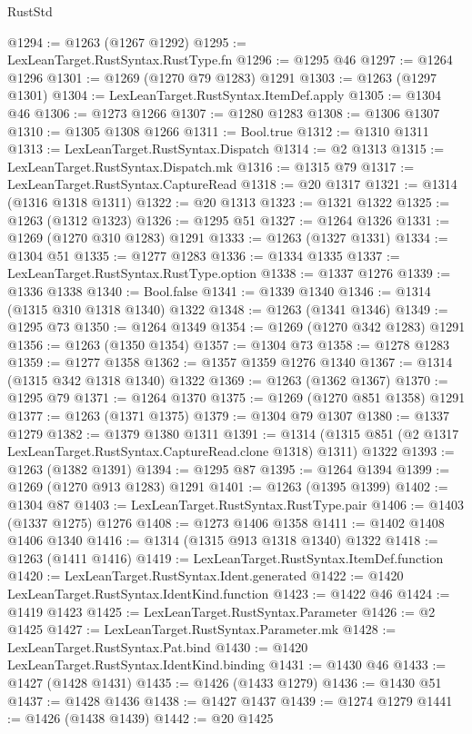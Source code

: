 \begin{lexlean}{RustStd}
\begin{coremodule}
@1294 := @1263 (@1267 @1292)
@1295 := LexLeanTarget.RustSyntax.RustType.fn
@1296 := @1295 @46
@1297 := @1264 @1296
@1301 := @1269 (@1270 @79 @1283) @1291
@1303 := @1263 (@1297 @1301)
@1304 := LexLeanTarget.RustSyntax.ItemDef.apply
@1305 := @1304 @46
@1306 := @1273 @1266
@1307 := @1280 @1283
@1308 := @1306 @1307
@1310 := @1305 @1308 @1266
@1311 := Bool.true
@1312 := @1310 @1311
@1313 := LexLeanTarget.RustSyntax.Dispatch
@1314 := @2 @1313
@1315 := LexLeanTarget.RustSyntax.Dispatch.mk
@1316 := @1315 @79
@1317 := LexLeanTarget.RustSyntax.CaptureRead
@1318 := @20 @1317
@1321 := @1314 (@1316 @1318 @1311)
@1322 := @20 @1313
@1323 := @1321 @1322
@1325 := @1263 (@1312 @1323)
@1326 := @1295 @51
@1327 := @1264 @1326
@1331 := @1269 (@1270 @310 @1283) @1291
@1333 := @1263 (@1327 @1331)
@1334 := @1304 @51
@1335 := @1277 @1283
@1336 := @1334 @1335
@1337 := LexLeanTarget.RustSyntax.RustType.option
@1338 := @1337 @1276
@1339 := @1336 @1338
@1340 := Bool.false
@1341 := @1339 @1340
@1346 := @1314 (@1315 @310 @1318 @1340) @1322
@1348 := @1263 (@1341 @1346)
@1349 := @1295 @73
@1350 := @1264 @1349
@1354 := @1269 (@1270 @342 @1283) @1291
@1356 := @1263 (@1350 @1354)
@1357 := @1304 @73
@1358 := @1278 @1283
@1359 := @1277 @1358
@1362 := @1357 @1359 @1276 @1340
@1367 := @1314 (@1315 @342 @1318 @1340) @1322
@1369 := @1263 (@1362 @1367)
@1370 := @1295 @79
@1371 := @1264 @1370
@1375 := @1269 (@1270 @851 @1358) @1291
@1377 := @1263 (@1371 @1375)
@1379 := @1304 @79 @1307
@1380 := @1337 @1279
@1382 := @1379 @1380 @1311
@1391 := @1314 (@1315 @851 (@2 @1317 LexLeanTarget.RustSyntax.CaptureRead.clone @1318) @1311) @1322
@1393 := @1263 (@1382 @1391)
@1394 := @1295 @87
@1395 := @1264 @1394
@1399 := @1269 (@1270 @913 @1283) @1291
@1401 := @1263 (@1395 @1399)
@1402 := @1304 @87
@1403 := LexLeanTarget.RustSyntax.RustType.pair
@1406 := @1403 (@1337 @1275) @1276
@1408 := @1273 @1406 @1358
@1411 := @1402 @1408 @1406 @1340
@1416 := @1314 (@1315 @913 @1318 @1340) @1322
@1418 := @1263 (@1411 @1416)
@1419 := LexLeanTarget.RustSyntax.ItemDef.function
@1420 := LexLeanTarget.RustSyntax.Ident.generated
@1422 := @1420 LexLeanTarget.RustSyntax.IdentKind.function
@1423 := @1422 @46
@1424 := @1419 @1423
@1425 := LexLeanTarget.RustSyntax.Parameter
@1426 := @2 @1425
@1427 := LexLeanTarget.RustSyntax.Parameter.mk
@1428 := LexLeanTarget.RustSyntax.Pat.bind
@1430 := @1420 LexLeanTarget.RustSyntax.IdentKind.binding
@1431 := @1430 @46
@1433 := @1427 (@1428 @1431)
@1435 := @1426 (@1433 @1279)
@1436 := @1430 @51
@1437 := @1428 @1436
@1438 := @1427 @1437
@1439 := @1274 @1279
@1441 := @1426 (@1438 @1439)
@1442 := @20 @1425

\end{coremodule}
\end{lexlean}

